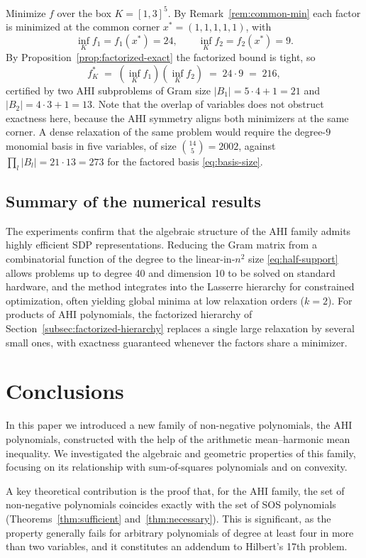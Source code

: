 \documentclass[12pt]{elsarticle}
\theoremstyle{definition}
\begin{document}
Minimize $f$ over the box $K = [1,3]^5$. By Remark~\ref{rem:common-min} each factor is minimized at the common corner $x^{*}=(1,1,1,1,1)$, with
\[
\inf_K f_1 = f_1(x^{*}) = 24, \qquad \inf_K f_2 = f_2(x^{*}) = 9 .
\]
By Proposition~\ref{prop:factorized-exact} the factorized bound is tight, so
\[
f^{*}_{K} \;=\; (\inf_K f_1)(\inf_K f_2) \;=\; 24 \cdot 9 \;=\; 216 ,
\]
certified by two AHI subproblems of Gram size $|B_1| = 5\cdot4+1 = 21$ and $|B_2| = 4\cdot3+1 = 13$. Note that the overlap of variables does not obstruct exactness here, because the AHI symmetry aligns both minimizers at the same corner. A dense relaxation of the same problem would require the degree-$9$ monomial basis in five variables, of size $\binom{14}{5} = 2002$, against $\prod_l|B_l| = 21\cdot 13 = 273$ for the factored basis \eqref{eq:basis-size}.

\subsection{Summary of the numerical results}\label{subsec:summary}
The experiments confirm that the algebraic structure of the AHI family admits highly efficient SDP representations. Reducing the Gram matrix from a combinatorial function of the degree to the linear-in-$n^2$ size \eqref{eq:half-support} allows problems up to degree 40 and dimension 10 to be solved on standard hardware, and the method integrates into the Lasserre hierarchy for constrained optimization, often yielding global minima at low relaxation orders ($k=2$). For products of AHI polynomials, the factorized hierarchy of Section~\ref{subsec:factorized-hierarchy} replaces a single large relaxation by several small ones, with exactness guaranteed whenever the factors share a minimizer.

\section{Conclusions}\label{sec:conclusions}

In this paper we introduced a new family of non-negative polynomials, the AHI polynomials, constructed with the help of the arithmetic mean--harmonic mean inequality. We investigated the algebraic and geometric properties of this family, focusing on its relationship with sum-of-squares polynomials and on convexity.

A key theoretical contribution is the proof that, for the AHI family, the set of non-negative polynomials coincides exactly with the set of SOS polynomials (Theorems~\ref{thm:sufficient} and~\ref{thm:necessary}). This is significant, as the property generally fails for arbitrary polynomials of degree at least four in more than two variables, and it constitutes an addendum to Hilbert's 17th problem.
\end{document}
